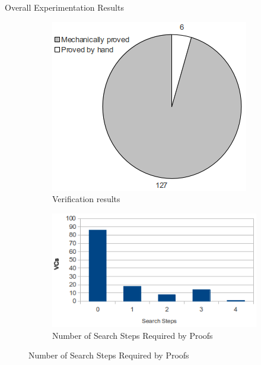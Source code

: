 \begin{frame}{Overall Experimentation Results}
	\begin{figure}
		\centering
		\begin{subfigure}[b]{0.40\textwidth}
			\centering
			\includegraphics[width=\textwidth]{../proverEval/proofResults3.png}
			\caption{Verification results\label{fig:pie}}
		\end{subfigure}
		\quad
		\begin{subfigure}[b]{0.55\textwidth}
			\centering
			\includegraphics[width=\textwidth]{../proverEval/searchSteps2.png}
			\caption{Number of Search Steps Required by Proofs\label{fig:histogram}}
		\end{subfigure}
	\end{figure}
\end{frame}


